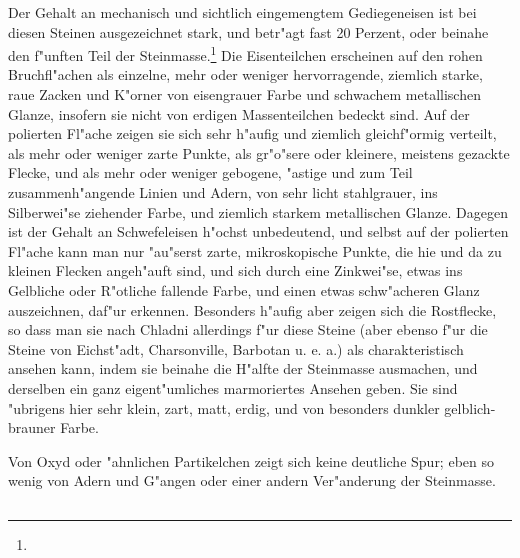 \documentclass[a4paper, 11pt, oneside, german]{article}
\begin{document}
Der Gehalt an mechanisch und sichtlich eingemengtem Gediegeneisen ist bei diesen Steinen ausgezeichnet stark, und betr"agt fast 20 Perzent, oder beinahe den f"unften Teil der Steinmasse.\footnote{} Die Eisenteilchen erscheinen auf den rohen Bruchfl"achen als einzelne, mehr oder weniger hervorragende, ziemlich starke, raue Zacken und K"orner von eisengrauer Farbe und schwachem metallischen Glanze, insofern sie nicht von erdigen Massenteilchen bedeckt sind. Auf der polierten Fl"ache zeigen sie sich sehr h"aufig und ziemlich gleichf"ormig verteilt, als mehr oder weniger zarte Punkte, als gr"o"sere oder kleinere, meistens gezackte Flecke, und als mehr oder weniger gebogene, "astige und zum Teil zusammenh"angende Linien und Adern, von sehr licht stahlgrauer, ins Silberwei"se ziehender Farbe, und ziemlich starkem metallischen Glanze. Dagegen ist der Gehalt an Schwefeleisen h"ochst unbedeutend, und selbst auf der polierten Fl"ache kann man nur "au"serst zarte, mikroskopische Punkte, die hie und da zu kleinen Flecken angeh"auft sind, und sich durch eine Zinkwei"se, etwas ins Gelbliche oder R"otliche fallende Farbe, und einen etwas schw"acheren Glanz auszeichnen, daf"ur erkennen. Besonders h"aufig aber zeigen sich die Rostflecke, so dass man sie nach Chladni allerdings f"ur diese Steine (aber ebenso f"ur die Steine von Eichst"adt, Charsonville, Barbotan u. e. a.) als charakteristisch ansehen kann, indem sie beinahe die H"alfte der Steinmasse ausmachen, und derselben ein ganz eigent"umliches marmoriertes Ansehen geben. Sie sind "ubrigens hier sehr klein, zart, matt, erdig, und von besonders dunkler gelblich-brauner Farbe.

Von Oxyd oder "ahnlichen Partikelchen zeigt sich keine deutliche Spur; eben so wenig von Adern und G"angen oder einer andern Ver"anderung der Steinmasse.

\subsection{}
\end{document}
